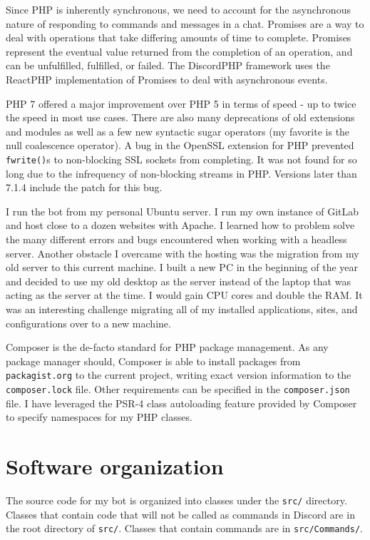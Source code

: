 \documentclass[12pt]{article} %
\begin{document}
Since PHP is inherently synchronous, we need to account for the asynchronous nature of responding to commands and messages in a chat. Promises are a way to deal with operations that take differing amounts of time to complete. Promises represent the eventual value returned from the completion of an operation, and can be unfulfilled, fulfilled, or failed. The DiscordPHP framework uses the ReactPHP implementation of Promises to deal with asynchronous events.

PHP 7 offered a major improvement over PHP 5 in terms of speed - up to twice the speed in most use cases. There are also many deprecations of old extensions and modules as well as a few new syntactic sugar operators (my favorite is the null coalescence operator). A bug in the OpenSSL extension for PHP prevented \verb|fwrite()|s to non-blocking SSL sockets from completing. It was not found for so long due to the infrequency of non-blocking streams in PHP. Versions later than 7.1.4 include the patch for this bug.

I run the bot from my personal Ubuntu server. I run my own instance of GitLab and host close to a dozen websites with Apache. I learned how to problem solve the many different errors and bugs encountered when working with a headless server. Another obstacle I overcame with the hosting was the migration from my old server to this current machine. I built a new PC in the beginning of the year and decided to use my old desktop as the server instead of the laptop that was acting as the server at the time. I would gain CPU cores and double the RAM. It was an interesting challenge migrating all of my installed applications, sites, and configurations over to a new machine.

Composer is the de-facto standard for PHP package management. As any package manager should, Composer is able to install packages from \verb|packagist.org| to the current project, writing exact version information to the \verb|composer.lock| file. Other requirements can be specified in the \verb|composer.json| file. I have leveraged the PSR-4 class autoloading feature provided by Composer to specify namespaces for my PHP classes.

\section*{Software organization}

The source code for my bot is organized into classes under the \verb|src/| directory. Classes that contain code that will not be called as commands in Discord are in the root directory of \verb|src/|. Classes that contain commands are in \verb|src/Commands/|. 
\end{document}
